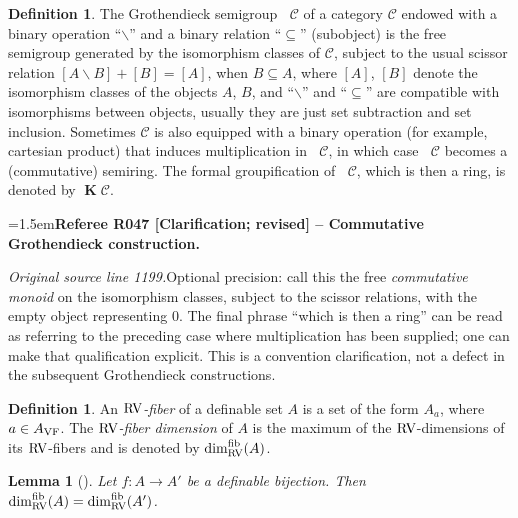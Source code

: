 \documentclass[12pt]{amsart}
\newcommand{\RefereeRemark}[4]{%
  \par\medskip\begingroup\normalfont\small\color{RefereePurple}%
  \emergencystretch=1.5em\noindent\textbf{Referee R#1 [#2] -- #3.}\par\nobreak\noindent #4\par
  \endgroup\medskip
}
\newcommand{\memph}[1]{{\color{magenta}\emph{#1}}}
\theoremstyle{plain}
\newtheorem{lem}[thm]{Lemma}
\theoremstyle{definition}
\newtheorem{defn}[thm]{Definition}
\theoremstyle{remark}
\numberwithin{equation}{section}
\theoremstyle{plain}
\newcommand{\VF}{\textup{VF}}
\newcommand{\RV}{\textup{RV}}
\newcommand{\0}{\emptyset}
\newcommand{\mdl}[1]{\mathcal{#1}}  %
\newcommand{\fun}{\longrightarrow}
\newcommand{\mi}{\smallsetminus}
\DeclareMathOperator{\gsk}{\mathbf{K}_+}
\DeclareMathOperator{\ggk}{\mathbf{K}}
\DeclareMathOperator{\fib}{fib}
\begin{document}
\begin{defn}
\label{def:Kgroup}
The Grothendieck semigroup $\gsk \mdl C$ of a category $\mdl C$ endowed with a binary operation ``$\mi$'' and a binary relation ``$\subseteq$'' (subobject) is the free semigroup generated by the isomorphism classes of $\mdl C$, subject to the usual scissor relation
$[A \mi B] + [B] = [A]$, when $B\subseteq A$,
where $[A]$, $[B]$ denote the isomorphism classes of the objects $A$, $B$, and ``$\mi$'' and ``$\subseteq$'' are compatible with isomorphisms between objects, usually they are just set subtraction and set inclusion. Sometimes $\mdl C$ is also equipped with a binary operation (for example, cartesian product) that induces multiplication in $\gsk \mdl C$, in which case $\gsk \mdl C$ becomes a (commutative) semiring. The formal groupification of  $\gsk \mdl C$, which is then a ring, is denoted by $\ggk \mdl C$. %

\RefereeRemark{047}{Clarification; revised}{Commutative Grothendieck construction}{%
\textit{Original source line 1199.}\quad Optional precision: call this the free \emph{commutative monoid} on the isomorphism classes, subject to the scissor relations, with the empty object representing $0$. The final phrase ``which is then a ring'' can be read as referring to the preceding case where multiplication has been supplied; one can make that qualification explicit. This is a convention clarification, not a defect in the subsequent Grothendieck constructions.
}
\end{defn}

\begin{defn}
An \memph{$\RV$-fiber} of a definable set $A$ is a set of the form $A_a$, where $a \in A_{\VF}$. The \memph{$\RV$-fiber dimension} of $A$ is the maximum of the $\RV$-dimensions of its $\RV$-fibers and is denoted by $\dim^{\fib}_{\RV}(A)$.
\end{defn}


\begin{lem}[{\cite[Lemma~4.13]{Yin:special:trans}}]\label{RV:fiber:dim:same}
Let $f : A \fun A'$ be a definable bijection. Then $\dim^{\fib}_{\RV}(A) = \dim^{\fib}_{\RV} (A')$.
\end{lem}
\end{document}
